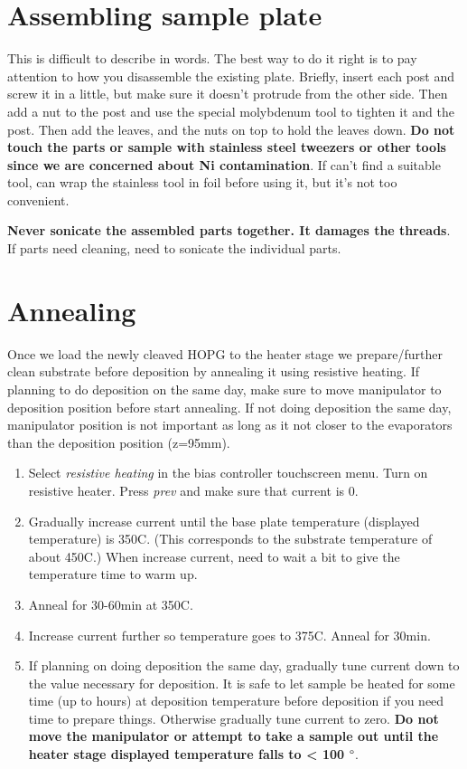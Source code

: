 \section{Assembling sample plate}
This is difficult to describe in words. The best way to do it right is to pay attention to  how you disassemble the existing plate. Briefly, insert each post and screw it in a little, but make sure it doesn't protrude from the other side. Then add a nut to the post and use the special molybdenum tool to tighten it and the post. Then add the leaves, and the nuts on top to hold the leaves down. \textbf{Do not touch the parts or sample with stainless steel tweezers or other tools since we are concerned about Ni contamination}. If can't find a suitable tool, can wrap the stainless tool in foil before using it, but it's not too convenient.  

\textbf{Never sonicate the assembled parts together. It damages the threads}. If parts need cleaning, need to sonicate the individual parts.
\section{Annealing}
Once we load the newly cleaved HOPG to the heater stage we prepare/further clean substrate before deposition by annealing it using resistive heating. If planning to do deposition on the same day, make sure to move manipulator to deposition position before start annealing. If not doing deposition the same day, manipulator position is not important as long as it not closer to the evaporators than the deposition position (z=95mm). 
\begin{enumerate}
\item Select \emph{resistive heating} in the bias controller touchscreen menu. Turn on resistive heater. Press \emph{prev} and make sure that current is 0. 
\item	Gradually increase current until the base plate temperature (displayed temperature) is 350C. (This corresponds to the substrate temperature of about 450C.) When increase current, need to wait a bit to give the temperature time to warm up. 
\item	Anneal for 30-60min at 350C.
\item	Increase current further so temperature goes to 375C. Anneal for 30min.
\item	If planning on doing deposition the same day, gradually tune current down to the value necessary for deposition. It is safe to let sample be heated for some time (up to hours) at deposition temperature before deposition if you need time to prepare things. Otherwise gradually tune current to zero. \textbf{Do not move the manipulator or attempt to take a sample out until the heater stage displayed temperature falls to < 100 $\degree$}. 
\end{enumerate}